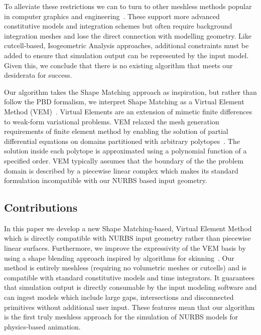 To alleviate these restrictions we can to turn to other meshless methods popular in computer graphics and 
engineering~\cite{10.1145/1028523.1028542,https://doi.org/10.1002/fld.1650200824,10.1145/1778765.1778776,10.1145/2010324.1964968, 10.1145/1944846.1944855}.
These support more advanced constitutive models and integration schemes but often require background integration meshes and lose the direct connection with
modelling geometry. 
Like cutcell-based, Isogeometric Analysis approaches, additional constraints must be added to ensure that simulation output can be represented by the input model.
Given this, we conclude that there is no existing algorithm that meets our desiderata for success. 

Our algorithm takes the Shape Matching approach as inspiration, but rather than follow the PBD formalism, we interpret Shape Matching as a 
Virtual Element Method (VEM)~\cite{10.1142/S0218202512500492,10.1142/S021820251440003X}. Virtual Elements are an extension of 
mimetic finite differences~\cite{10.1142/S0218202505000832,10.1016/j.jcp.2013.07.031} to weak-form variational problems. 
VEM relaxed the mesh generation requirements of finite element method by enabling the solution of partial differential equations
on domains partitioned with arbitrary polytopes~\cite{10.1145/3386569.3392389}. 
The solution inside each polytope is approximated using a polynomial function of a specified order.
VEM typically assumes that the boundary of the the problem domain is described by a piecewise linear complex
which makes its standard formulation incompatible with our NURBS based input geometry. 


\subsection*{Contributions} 
In this paper we develop a new Shape Matching-based, Virtual Element Method which is directly compatible 
with NURBS input geometry rather than piecewise linear surfaces. 
Furthermore, we improve the expressivity of the VEM basis by using a shape blending approach inspired by
algorithms for skinning~\cite{skinningcourse:2014}.
Our method is entirely meshless (requiring no volumetric meshes or cutcells) and is compatible with standard constitutive models and time integrators.
It guarantees that simulation output is directly consumable by the input modeling software and can ingest models which include large gaps,
intersections and disconnected primitives without additional user input. 
These features mean that our algorithm is the first truly meshless approach for the simulation of NURBS models for physics-based animation.


